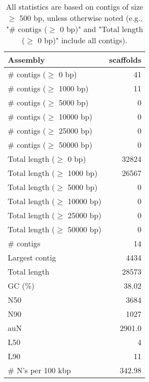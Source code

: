 \documentclass[12pt,a4paper]{article}
\begin{document}
\begin{table}[ht]
\begin{center}
\caption{All statistics are based on contigs of size $\geq$ 500 bp, unless otherwise noted (e.g., "\# contigs ($\geq$ 0 bp)" and "Total length ($\geq$ 0 bp)" include all contigs).}
\begin{tabular}{|l*{1}{|r}|}
\hline
Assembly & scaffolds \\ \hline
\# contigs ($\geq$ 0 bp) & 41 \\ \hline
\# contigs ($\geq$ 1000 bp) & 11 \\ \hline
\# contigs ($\geq$ 5000 bp) & 0 \\ \hline
\# contigs ($\geq$ 10000 bp) & 0 \\ \hline
\# contigs ($\geq$ 25000 bp) & 0 \\ \hline
\# contigs ($\geq$ 50000 bp) & 0 \\ \hline
Total length ($\geq$ 0 bp) & 32824 \\ \hline
Total length ($\geq$ 1000 bp) & 26567 \\ \hline
Total length ($\geq$ 5000 bp) & 0 \\ \hline
Total length ($\geq$ 10000 bp) & 0 \\ \hline
Total length ($\geq$ 25000 bp) & 0 \\ \hline
Total length ($\geq$ 50000 bp) & 0 \\ \hline
\# contigs & 14 \\ \hline
Largest contig & 4434 \\ \hline
Total length & 28573 \\ \hline
GC (\%) & 38.02 \\ \hline
N50 & 3684 \\ \hline
N90 & 1027 \\ \hline
auN & 2901.0 \\ \hline
L50 & 4 \\ \hline
L90 & 11 \\ \hline
\# N's per 100 kbp & 342.98 \\ \hline
\end{tabular}
\end{center}
\end{table}
\end{document}
